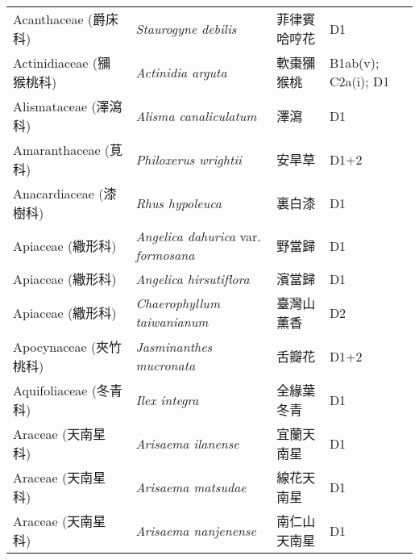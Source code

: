 \begin{longtable}{p{3cm}p{5cm}p{3cm}p{4cm}}
    Acanthaceae (爵床科) & \textit{Staurogyne debilis}  & 菲律賓哈哼花 & D1 \index{Staurogyne@\textit{Staurogyne}!debilis@\textit{debilis}}  \index{菲律賓哈哼花} \\
    Actinidiaceae (獼猴桃科) & \textit{Actinidia arguta}  & 軟棗獼猴桃 & B1ab(v); C2a(i); D1 \index{Actinidia@\textit{Actinidia}!arguta@\textit{arguta}}  \index{軟棗獼猴桃} \\
    Alismataceae (澤瀉科) & \textit{Alisma canaliculatum}  & 澤瀉 & D1 \index{Alisma@\textit{Alisma}!canaliculatum@\textit{canaliculatum}}  \index{澤瀉} \\
    Amaranthaceae (莧科) & \textit{Philoxerus wrightii}  & 安旱草 & D1+2 \index{Philoxerus@\textit{Philoxerus}!wrightii@\textit{wrightii}}  \index{安旱草} \\
    Anacardiaceae (漆樹科) & \textit{Rhus hypoleuca}  & 裏白漆 & D1 \index{Rhus@\textit{Rhus}!hypoleuca@\textit{hypoleuca}}  \index{裏白漆} \\
    Apiaceae (繖形科) & \textit{Angelica dahurica} var. \textit{formosana}  & 野當歸 & D1 \index{Angelica@\textit{Angelica}!dahurica@\textit{dahurica}!var. formosana@var. \textit{formosana}}  \index{野當歸} \\
    Apiaceae (繖形科) & \textit{Angelica hirsutiflora}  & 濱當歸 & D1 \index{Angelica@\textit{Angelica}!hirsutiflora@\textit{hirsutiflora}}  \index{濱當歸} \\
    Apiaceae (繖形科) & \textit{Chaerophyllum taiwanianum}  & 臺灣山薰香 & D2 \index{Chaerophyllum@\textit{Chaerophyllum}!taiwanianum@\textit{taiwanianum}}  \index{臺灣山薰香} \\
    Apocynaceae (夾竹桃科) & \textit{Jasminanthes mucronata}  & 舌瓣花 & D1+2 \index{Jasminanthes@\textit{Jasminanthes}!mucronata@\textit{mucronata}}  \index{舌瓣花} \\
    Aquifoliaceae (冬青科) & \textit{Ilex integra}  & 全緣葉冬青 & D1 \index{Ilex@\textit{Ilex}!integra@\textit{integra}}  \index{全緣葉冬青} \\
    Araceae (天南星科) & \textit{Arisaema ilanense}  & 宜蘭天南星 & D1 \index{Arisaema@\textit{Arisaema}!ilanense@\textit{ilanense}}  \index{宜蘭天南星} \\
    Araceae (天南星科) & \textit{Arisaema matsudae}  & 線花天南星 & D1 \index{Arisaema@\textit{Arisaema}!matsudae@\textit{matsudae}}  \index{線花天南星} \\
    Araceae (天南星科) & \textit{Arisaema nanjenense}  & 南仁山天南星 & D1 \index{Arisaema@\textit{Arisaema}!nanjenense@\textit{nanjenense}}  \index{南仁山天南星} \\

\end{longtable}
